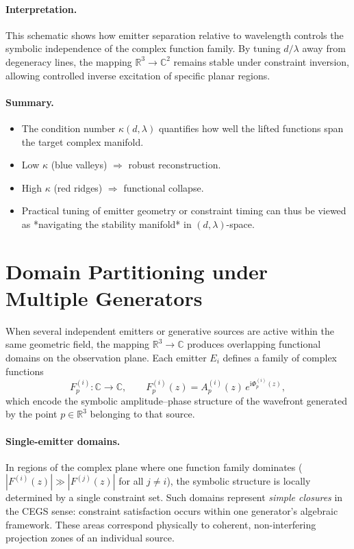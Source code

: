 \documentclass[11pt]{article}
\theoremstyle{plain}
\theoremstyle{definition}
\theoremstyle{remark}
\begin{document}
\paragraph{Interpretation.}
This schematic shows how emitter separation relative to wavelength
controls the symbolic independence of the complex function family.
By tuning \(d/\lambda\) away from degeneracy lines,
the mapping \(\mathbb{R}^3 \to \mathbb{C}^2\)
remains stable under constraint inversion, allowing controlled
inverse excitation of specific planar regions.

\paragraph{Summary.}
\begin{itemize}
  \item The condition number \(\kappa(d,\lambda)\) quantifies how well
        the lifted functions span the target complex manifold.
  \item Low \(\kappa\) (blue valleys) $\Rightarrow$ robust reconstruction.
  \item High \(\kappa\) (red ridges) $\Rightarrow$ functional collapse.
  \item Practical tuning of emitter geometry or constraint timing
        can thus be viewed as *navigating the stability manifold* in
        \((d,\lambda)\)-space.
\end{itemize}

\section*{Domain Partitioning under Multiple Generators}

When several independent emitters or generative sources are active within the same geometric field, the mapping 
\(\mathbb{R}^3 \rightarrow \mathbb{C}\)
produces overlapping functional domains on the observation plane.
Each emitter \(E_i\) defines a family of complex functions
\[
F^{(i)}_p : \mathbb{C} \to \mathbb{C}, \qquad
F^{(i)}_p(z) = A^{(i)}_p(z)\, e^{\mathrm{i}\Phi^{(i)}_p(z)},
\]
which encode the symbolic amplitude--phase structure of the wavefront generated by the point \(p \in \mathbb{R}^3\)
belonging to that source.

\paragraph{Single-emitter domains.}
In regions of the complex plane where one function family dominates
(\(|F^{(i)}(z)| \gg |F^{(j)}(z)|\) for all \(j\neq i\)),
the symbolic structure is locally determined by a single constraint set.
Such domains represent \emph{simple closures} in the CEGS sense:
constraint satisfaction occurs within one generator’s algebraic framework.
These areas correspond physically to coherent, non-interfering projection zones of an individual source.
\end{document}
